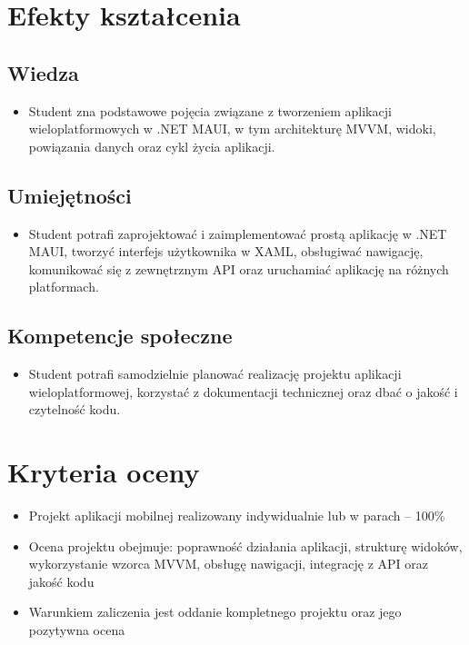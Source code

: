 \documentclass[12pt, a4paper]{article}
\begin{document}
\section{Efekty kształcenia}

\subsection*{Wiedza}
\begin{itemize}
  \item Student zna podstawowe pojęcia związane z tworzeniem aplikacji wieloplatformowych w .NET MAUI, w tym architekturę MVVM, widoki, powiązania danych oraz cykl życia aplikacji.
\end{itemize}

\subsection*{Umiejętności}
\begin{itemize}
  \item Student potrafi zaprojektować i zaimplementować prostą aplikację w .NET MAUI, tworzyć interfejs użytkownika w XAML, obsługiwać nawigację, komunikować się z zewnętrznym API oraz uruchamiać aplikację na różnych platformach.
\end{itemize}

\subsection*{Kompetencje społeczne}
\begin{itemize}
  \item Student potrafi samodzielnie planować realizację projektu aplikacji wieloplatformowej, korzystać z dokumentacji technicznej oraz dbać o jakość i czytelność kodu.
\end{itemize}

\section{Kryteria oceny}

\begin{itemize}
  \item Projekt aplikacji mobilnej realizowany indywidualnie lub w parach – 100\%
  \item Ocena projektu obejmuje: poprawność działania aplikacji, strukturę widoków, wykorzystanie wzorca MVVM, obsługę nawigacji, integrację z API oraz jakość kodu
  \item Warunkiem zaliczenia jest oddanie kompletnego projektu oraz jego pozytywna ocena
\end{itemize}
\end{document}
